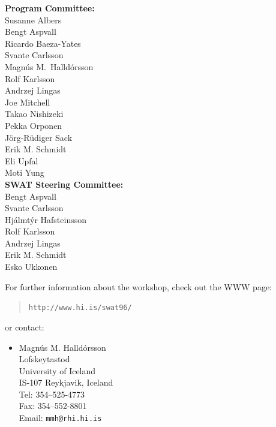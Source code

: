 {\bf Program Committee:} \\
{\who Susanne Albers}  \\
{\who Bengt Aspvall}  \\
{\who Ricardo Baeza-Yates}  \\
{\who Svante Carlsson}  \\
{\who Magn\'us M.\ Halld\'orsson}  \\
{\who Rolf Karlsson}  \\
{\who Andrzej Lingas}  \\
{\who Joe Mitchell}  \\
{\who Takao Nishizeki}  \\
{\who Pekka Orponen}  \\
{\who J\"org-R\"udiger Sack}  \\
{\who Erik M. Schmidt}  \\
{\who Eli Upfal}  \\
{\who Moti Yung}  \\

{\bf SWAT Steering Committee:} \\
{\who Bengt Aspvall}  \\
{\who Svante Carlsson}  \\
{\who Hj\'almt\'yr Hafsteinsson}  \\
{\who Rolf Karlsson}  \\
{\who Andrzej Lingas}  \\
{\who Erik M. Schmidt}  \\
{\who Esko Ukkonen}  \\

\vskip 2cm

For further information about the workshop, check out the WWW page:
\begin{quote}
  \tt http://www.hi.is/swat96/
\end{quote}
or contact:
\begin{itemize}
\item[]
Magn\'us M. Halld\'orsson \\
Lofskeytastod \\
University of Iceland \\
IS-107 Reykjavik, Iceland \\
Tel: 354--525-4773 \\
Fax: 354--552-8801 \\ 
Email: \tt mmh@rhi.hi.is 
\end{itemize}


